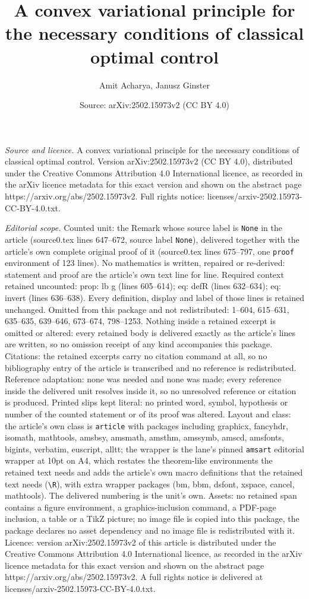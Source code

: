 \documentclass[10pt,a4paper]{amsart}
\title[A convex variational principle for the necessary conditions ]{A convex variational principle for the necessary conditions of classical optimal control}
\author{Amit Acharya, Janusz Ginster}
\date{Source: arXiv:2502.15973v2 (CC BY 4.0)}
\begin{document}
\maketitle

\noindent\emph{Source and licence.} A convex variational principle for the necessary conditions of classical optimal control. Version arXiv:2502.15973v2 (CC BY 4.0), distributed under the Creative Commons Attribution 4.0 International licence, as recorded in the arXiv licence metadata for this exact version and shown on the abstract page https://arxiv.org/abs/2502.15973v2. Full rights notice: licenses/arxiv-2502.15973-CC-BY-4.0.txt.\par\smallskip

\noindent\textit{Editorial scope.} Counted unit: the Remark whose source label is \texttt{None} in the article (source0.tex lines 647--672, source label \texttt{None}), delivered together with the article's own complete original proof of it (source0.tex lines 675--797, one \texttt{proof} environment of 123 lines). No mathematics is written, repaired or re-derived: statement and proof are the article's own text line for line. Required context retained uncounted: prop: lb g (lines 605--614); eq: defR (lines 632--634); eq: invert (lines 636--638). Every definition, display and label of those lines is retained unchanged. Omitted from this package and not redistributed: 1--604, 615--631, 635--635, 639--646, 673--674, 798--1253. Nothing inside a retained excerpt is omitted or altered: every retained body is delivered exactly as the article's lines are written, so no omission receipt of any kind accompanies this package. Citations: the retained excerpts carry no citation command at all, so no bibliography entry of the article is transcribed and no reference is redistributed. Reference adaptation: none was needed and none was made; every reference inside the delivered unit resolves inside it, so no unresolved reference or citation is produced. Printed slips kept literal: no printed word, symbol, hypothesis or number of the counted statement or of its proof was altered. Layout and class: the article's own class is \texttt{article} with packages including graphicx, fancyhdr, isomath, mathtools, amsbsy, amsmath, amsthm, amssymb, amscd, amsfonts, bigints, verbatim, euscript, alltt; the wrapper is the lane's pinned \texttt{amsart} editorial wrapper at 10pt on A4, which restates the theorem-like environments the retained text needs and adds the article's own macro definitions that the retained text needs (\texttt{\textbackslash R}), with extra wrapper packages (bm, bbm, dsfont, xspace, cancel, mathtools). The delivered numbering is the unit's own. Assets: no retained span contains a figure environment, a graphics-inclusion command, a PDF-page inclusion, a table or a TikZ picture; no image file is copied into this package, the package declares no asset dependency and no image file is redistributed with it. Licence: version arXiv:2502.15973v2 of this article is distributed under the Creative Commons Attribution 4.0 International licence, as recorded in the arXiv licence metadata for this exact version and shown on the abstract page https://arxiv.org/abs/2502.15973v2. A full rights notice is delivered at licenses/arxiv-2502.15973-CC-BY-4.0.txt. 
\end{document}
